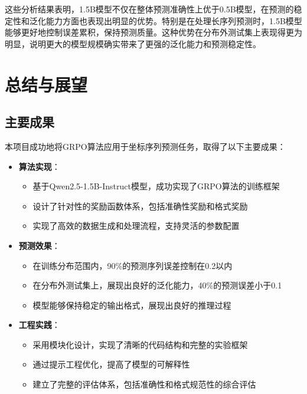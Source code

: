 \documentclass[a4paper, 12pt]{article}
\begin{document}
这些分析结果表明，1.5B模型不仅在整体预测准确性上优于0.5B模型，在预测的稳定性和泛化能力方面也表现出明显的优势。特别是在处理长序列预测时，1.5B模型能够更好地控制误差累积，保持预测质量。这种优势在分布外测试集上表现得更为明显，说明更大的模型规模确实带来了更强的泛化能力和预测稳定性。

\section{总结与展望}
\subsection{主要成果}
本项目成功地将GRPO算法应用于坐标序列预测任务，取得了以下主要成果：

\begin{itemize}
    \item \textbf{算法实现}：
        \begin{itemize}
            \item 基于Qwen2.5-1.5B-Instruct模型，成功实现了GRPO算法的训练框架
            \item 设计了针对性的奖励函数体系，包括准确性奖励和格式奖励
            \item 实现了高效的数据生成和处理流程，支持灵活的参数配置
        \end{itemize}
    
    \item \textbf{预测效果}：
        \begin{itemize}
            \item 在训练分布范围内，90\%的预测序列误差控制在0.2以内
            \item 在分布外测试集上，展现出良好的泛化能力，40\%的预测误差小于0.1
            \item 模型能够保持稳定的输出格式，展现出良好的推理过程
        \end{itemize}
    
    \item \textbf{工程实践}：
        \begin{itemize}
            \item 采用模块化设计，实现了清晰的代码结构和完整的实验框架
            \item 通过提示工程优化，提高了模型的可解释性
            \item 建立了完整的评估体系，包括准确性和格式规范性的综合评估
        \end{itemize}
\end{itemize}
\end{document}
